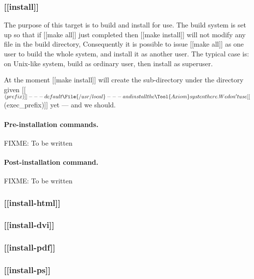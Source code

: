 \documentclass{article}
\begin{document}
\subsubsection{[[install]]}
\label{sec:general-structure:std-targets:install}

The purpose of this target is to build  and install for
use.  The build system is set up  so that if [[make all]] just completed
then [[make install]] will not modify any file in the build directory,
Consequently it is possible to issue [[make all]] as one
user to build the whole system, and install it as another user.  The typical
case is: on Unix-like system, build as ordinary user, then install as
superuser.

At the moment [[make install]] will create the sub-directory 
under the directory given [[$(prefix)]] --- default \File{/usr/local} ---
and install the \Tool{Axiom} systen there.  We don't use
[[$(exec_prefix)]] yet --- and we should.

\paragraph{Pre-installation commands.}
FIXME: To be written

\paragraph{Post-installation command.}
FIXME: To be written

\subsubsection{[[install-html]]}
\label{sec:general-structure:std-targets:install-html}

\subsubsection{[[install-dvi]]}
\label{sec:general-structure:std-targets:install-dvi}

\subsubsection{[[install-pdf]]}
\label{sec:general-structure:std-targets:install-pdf}

\subsubsection{[[install-ps]]}
\label{sec:general-structure:std-targets:install-ps}
\end{document}
